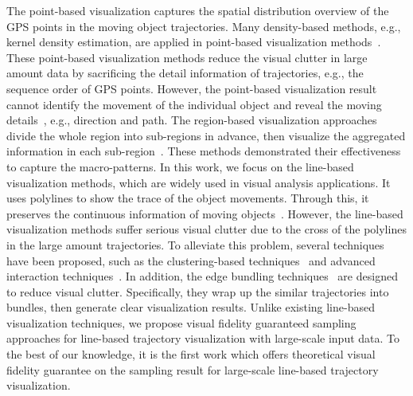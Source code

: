 The point-based visualization captures the spatial distribution overview of the GPS points in the moving object trajectories.
Many density-based methods, e.g., kernel density estimation, are applied in point-based visualization methods~\cite{liu2013vait,yang2016exploring,chae2014public,xie2008kernel, borruso2008network}.
These point-based visualization methods reduce the visual clutter in large amount data by sacrificing the detail information of trajectories, e.g., the sequence order of GPS points.
However, the point-based visualization result cannot identify the movement of the individual object and reveal the moving details~\cite{chen2015survey}, e.g.,  direction and path.
The region-based visualization approaches divide the whole region into sub-regions in advance, then visualize the aggregated information in each sub-region~\cite{guo2009flow,wood2010visualisation,von2015mobilitygraphs}.
These methods demonstrated their effectiveness to capture the macro-patterns.
In this work, we focus on the line-based visualization methods, which are widely used in visual analysis applications.
It uses polylines to show the trace of the object movements.
Through this, it preserves the continuous information of moving objects~\cite{guo2011tripvista,hurter2009fromdady}.
However, the line-based visualization methods suffer serious visual clutter due to the cross of the polylines in the large amount trajectories.
To alleviate this problem, several techniques have been proposed, such as the clustering-based techniques~\cite{ferreira2013vector, rinzivillo2008visually, von2015mobilitygraphs} and advanced interaction techniques~\cite{kruger2013trajectorylenses, ferreira2013visual}.
In addition, the edge bundling techniques~\cite{zeng2019route,thony2015vector} are designed to reduce visual clutter.
Specifically, they wrap up the similar trajectories into bundles, then generate clear visualization results.
Unlike existing line-based visualization techniques, we propose visual fidelity  guaranteed sampling approaches for line-based trajectory visualization with large-scale input data.
To the best of our knowledge, it is the first work which offers theoretical visual fidelity guarantee on the sampling result for large-scale line-based trajectory visualization.





